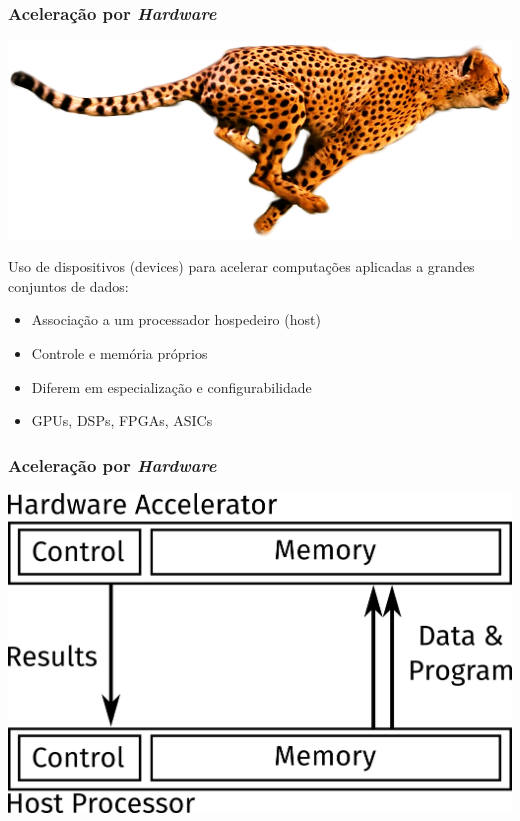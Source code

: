 \documentclass[10pt, compress]{beamer}
\begin{document}
\begin{frame}
    \frametitle{Aceleração por \textit{Hardware}}
    \begin{center}
        \includegraphics[width=.6\textwidth]{accelerate}
    \end{center}

    Uso de \alert{dispositivos} (devices) para acelerar computações aplicadas a
    grandes conjuntos de dados:

    \begin{itemize}
        \item Associação a um processador \alert{hospedeiro} (host)
        \item Controle e memória próprios
        \item Diferem em especialização e configurabilidade
        \item \alert{GPUs}, DSPs, FPGAs, ASICs
    \end{itemize}
\end{frame}

\begin{frame}
    \frametitle{Aceleração por \textit{Hardware}}
    \centering
    \includegraphics[width=.8\textwidth]{accel}
\end{frame}
\end{document}
